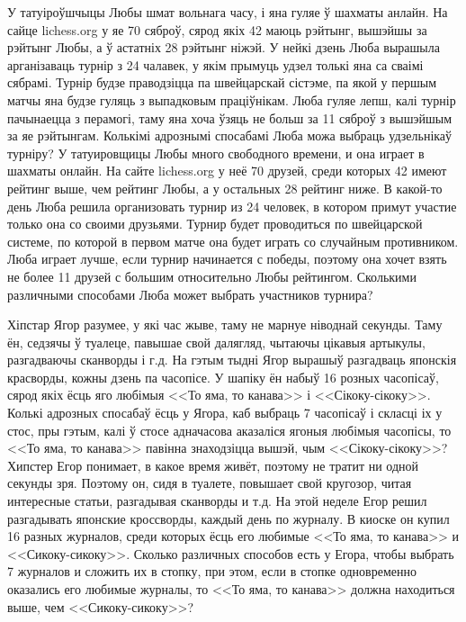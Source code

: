 \documentclass[11pt]{article}
\begin{document}
\begin{problemList}
\medskip

\problemItemSimple
{У татуіроўшчыцы Любы шмат вольнага часу, і яна гуляе ў шахматы анлайн.
На сайце lichess.org у яе 70 сяброў, сярод якіх 42 маюць рэйтынг, вышэйшы за рэйтынг Любы, а ў астатніх 28 рэйтынг ніжэй.
У нейкі дзень Люба вырашыла арганізаваць турнір з 24 чалавек, у якім прымуць удзел толькі яна са сваімі сябрамі.
Турнір будзе праводзіцца па швейцарскай сістэме, па якой у першым матчы яна будзе гуляць з выпадковым праціўнікам.
Люба гуляе лепш, калі турнір пачынаецца з перамогі, таму яна хоча ўзяць не больш за 11 сяброў з вышэйшым за яе рэйтынгам.
Колькімі адрознымі спосабамі Люба можа выбраць удзельнікаў турніру?}
{У татуировщицы Любы много свободного времени, и она играет в шахматы онлайн.
На сайте lichess.org у неё 70 друзей, среди которых 42 имеют рейтинг выше, чем рейтинг Любы, а у остальных 28 рейтинг ниже.
В какой-то день Люба решила организовать турнир из 24 человек, в котором примут участие только она со своими друзьями.
Турнир будет проводиться по швейцарской системе, по которой в первом матче она будет играть со случайным противником.
Люба играет лучше, если турнир начинается с победы, поэтому она хочет взять не более 11 друзей с большим относительно Любы рейтингом.
Сколькими различными способами Люба может выбрать участников турнира?}

\medskip

\problemItemSimple
{Хіпстар Ягор разумее, у які час жыве, таму не марнуе ніводнай секунды.
Таму ён, седзячы ў туалеце, павышае свой далягляд, чытаючы цікавыя артыкулы, разгадваючы сканворды і г.д.
На гэтым тыдні Ягор вырашыў разгадваць японскія красворды, кожны дзень па часопісе.
У шапіку ён набыў 16 розных часопісаў, сярод якіх ёсць яго любімыя <<То яма, то канава>> і <<Сікоку-сікоку>>.
Колькі адрозных спосабаў ёсць у Ягора, каб выбраць 7 часопісаў і скласці іх у стос, пры гэтым, калі ў стосе адначасова аказаліся ягоныя любімыя часопісы, то <<То яма, то канава>> павінна знаходзіцца вышэй, чым <<Сікоку-сікоку>>?}
{Хипстер Егор понимает, в какое время живёт, поэтому не тратит ни одной секунды зря.
Поэтому он, сидя в туалете, повышает свой кругозор, читая интересные статьи, разгадывая сканворды и т.д.
На этой неделе Егор решил разгадывать японские кроссворды, каждый день по журналу.
В киоске он купил 16 разных журналов, среди которых ёсць его любимые <<То яма, то канава>> и <<Сикоку-сикоку>>.
Сколько различных способов есть у Егора, чтобы выбрать 7 журналов и сложить их в стопку, при этом,
если в стопке одновременно оказались его любимые журналы, то <<То яма, то канава>> должна находиться выше, чем <<Сикоку-сикоку>>?}


\end{problemList}
\end{document}

